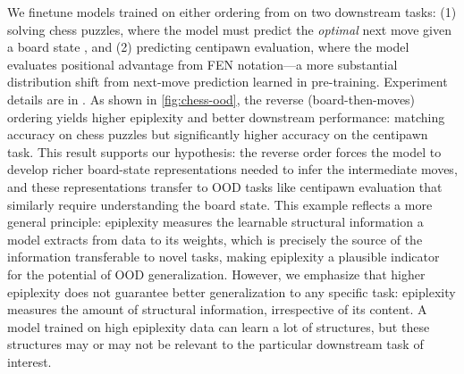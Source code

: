 \documentclass[twoside]{article}
\begin{document}
%
We finetune models trained on either ordering from  on two downstream tasks: (1) solving chess puzzles, where the model must predict the \emph{optimal} next move given a board state \citep{burns2023weak}, and (2) predicting centipawn evaluation, where the model evaluates positional advantage from FEN notation—a more substantial distribution shift from next-move prediction learned in pre-training. Experiment details are in .
As shown in \autoref{fig:chess-ood}, the reverse (board-then-moves) ordering yields higher epiplexity and better downstream performance: matching accuracy on chess puzzles but significantly higher accuracy on the centipawn task. This result supports our hypothesis: the reverse order forces the model to develop richer board-state representations needed to infer the intermediate moves, and these representations transfer to OOD tasks like centipawn evaluation that similarly require understanding the board state. This example reflects a more general principle: epiplexity measures the learnable structural information a model extracts from data to its weights, which is precisely the source of the information transferable to novel tasks, making epiplexity a plausible indicator for the potential of OOD generalization. However, we emphasize that higher epiplexity does not guarantee better generalization to any specific task: epiplexity measures the amount of structural information, irrespective of its content. A model trained on high epiplexity data can learn a lot of structures, but these structures may or may not be relevant to the particular downstream task of interest.

%
%
\end{document}
